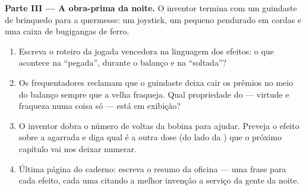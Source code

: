\begin{problem}
\medskip\noindent\textbf{Parte III --- A obra-prima da noite.}
O inventor termina com um guindaste de brinquedo para a quermesse: um
joystick, um  pequeno pendurado em cordas e uma caixa de
bugigangas de ferro.
\begin{enumerate}[resume]
  \item Escreva o roteiro da jogada vencedora na linguagem dos
        efeitos: o que acontece na ``pegada'', durante o balanço e na
        ``soltada''?
  \item Os frequentadores reclamam que o guindaste deixa cair os
        prêmios no meio do balanço sempre que a  velha fraqueja.
        Qual propriedade do  --- virtude e fraqueza numa
        coisa só --- está em exibição?
  \item O inventor dobra o número de voltas da bobina para ajudar.
        Preveja o efeito sobre a agarrada e diga qual é a outra dose
        (do lado da ) que o próximo capítulo vai nos deixar
        numerar.
  \item Última página do caderno: escreva o resumo da oficina --- uma
        frase para cada efeito, cada uma citando a melhor invenção a
        serviço da gente da noite.
\end{enumerate}
\end{problem}
